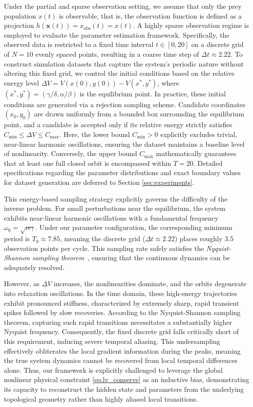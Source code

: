Under the partial and sparse observation setting, we assume that only the prey population $x(t)$ is observable, that is, the observation function is defined as a projection $h(\mathbf{x}(t)) = x_\mathrm{obs}(t) = x(t)$.
A highly sparse observation regime is employed to evaluate the parameter estimation framework. 
Specifically, the observed data is restricted to a fixed time interval $t \in [0, 20]$ on a discrete grid of $N=10$ evenly spaced points, resulting in a coarse time step of $\Delta t \approx 2.22$.
To construct simulation datasets that capture the system's periodic nature without altering this fixed grid, we control the initial conditions based on the relative energy level $\Delta V = V(x(0), y(0)) - V(x^*, y^*)$, where $(x^*, y^*) = (\gamma/\delta, \alpha/\beta)$ is the equilibrium point. 
In practice, these initial conditions are generated via a rejection sampling scheme. 
Candidate coordinates $(x_0, y_0)$ are drawn uniformly from a bounded box surrounding the equilibrium point, and a candidate is accepted only if its relative energy strictly satisfies $C_{\min} \le \Delta V \le C_{\max}$. 
Here, the lower bound $C_{\min} > 0$ explicitly excludes trivial, near-linear harmonic oscillations, ensuring the dataset maintains a baseline level of nonlinearity. 
Conversely, the upper bound $C_{\max}$ mathematically guarantees that at least one full closed orbit is encompassed within $T=20$. 
Detailed specifications regarding the parameter distributions and exact boundary values for dataset generation are deferred to Section \ref{sec:experiments}.

This energy-based sampling strategy explicitly governs the difficulty of the inverse problem.
For small perturbations near the equilibrium, the system exhibits near-linear harmonic oscillations with a fundamental frequency $\omega_0 = \sqrt{\alpha\gamma}$. 
Under our parameter configuration, the corresponding minimum period is $T_0 \approx 7.85$, meaning the discrete grid ($\Delta t \approx 2.22$) places roughly 3.5 observation points per cycle. 
This sampling rate safely satisfies the \emph{Nyquist-Shannon sampling theorem}~\cite{shannon2006communication}, ensuring that the continuous dynamics can be adequately resolved.

However, as $\Delta V$ increases, the nonlinearities dominate, and the orbits degenerate into relaxation oscillations. 
In the time domain, these high-energy trajectories exhibit pronounced stiffness, characterized by extremely sharp, rapid transient spikes followed by slow recoveries. 
According to the Nyquist-Shannon sampling theorem, capturing such rapid transitions necessitates a substantially higher Nyquist frequency. 
Consequently, the fixed discrete grid falls critically short of this requirement, inducing severe temporal aliasing. 
This undersampling effectively obliterates the local gradient information during the peaks, meaning the true system dynamics cannot be recovered from local temporal differences alone. 
Thus, our framework is explicitly challenged to leverage the global nonlinear physical constraint \eqref{eq:lv_conserve} as an inductive bias, demonstrating its capacity to reconstruct the hidden state and parameters from the underlying topological geometry rather than highly aliased local transitions.

